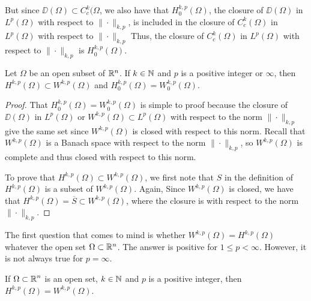 \begin{rmkList}
\begin{enumerate}
But since $\DD(\Omega) \subset C^k_c(\Omega$, we also have that
$\displaystyle H^{k,p}_0(\Omega)$, the closure of
$\displaystyle \DD(\Omega)$ in $\displaystyle L^p(\Omega)$ with
respect to $\|\cdot\|_{k,p}$, is included in the closure of
$\displaystyle C^k_c(\Omega)$ in
$\displaystyle L^p(\Omega)$ with respect to $\|\cdot\|_{k,p}$ 
Thus, the closure of $\displaystyle C^k_c(\Omega)$ in
$\displaystyle L^p(\Omega)$ with respect to $\|\cdot\|_{k,p}$
is $\displaystyle H^{k,p}_0(\Omega)$.
\end{enumerate}
\end{rmkList}

\begin{prop} \label{sob_WcontainsH}
Let $\Omega$ be an open subset of $\mathbb{R}^n$.  If
$k\in \mathbb{N}$ and $p$ is a positive integer or $\infty$, then
$\displaystyle H^{k,p}(\Omega) \subset W^{k,p}(\Omega)$ and
$\displaystyle H^{k,p}_0(\Omega) = W^{k,p}_0(\Omega)$.
\end{prop}

\begin{proof}
That $\displaystyle H^{k,p}_0(\Omega) = W^{k,p}_0(\Omega)$ is simple
to proof because the closure of $\DD(\Omega)$ in $\displaystyle L^p(\Omega)$ or
$\displaystyle W^{k,p}(\Omega)\subset L^p(\Omega)$ with respect to the
norm $\|\cdot\|_{k,p}$ give the same
set since $\displaystyle W^{k,p}(\Omega)$ is closed with respect to this norm.
Recall that $\displaystyle W^{k,p}(\Omega)$ is a Banach space with
respect to the norm 
$\|\cdot\|_{k,p}$, so $\displaystyle W^{k,p}(\Omega)$ is complete and
thus closed with respect to this norm.

To prove that $\displaystyle H^{k,p}(\Omega) \subset W^{k,p}(\Omega)$,
we first note that $S$ in the definition of
$\displaystyle H^{k,p}(\Omega)$ is a subset of
$\displaystyle W^{k,p}(\Omega)$.  Again, Since
$\displaystyle W^{k,p}(\Omega)$ is closed, we have that
$\displaystyle H^{k,p}(\Omega) = \overline{S} \subset W^{k,p}(\Omega)$,
where the closure is with respect to the norm $\|\cdot\|_{k,p}$.
\end{proof}

The first question that comes to mind is whether
$\displaystyle W^{k,p}(\Omega) = H^{k,p}(\Omega)$ whatever the open set
$\Omega \subset \mathbb{R}^n$.  The answer is positive for
$1\leq p < \infty$.  However, it is not always true for $p=\infty$.

\begin{theorem} \label{sob_HequalsW}
If $\displaystyle \Omega \subset \mathbb{R}^n$ is an open set, $k\in \mathbb{N}$ and $p$ is a
positive integer, then $\displaystyle H^{k,p}(\Omega) = W^{k,p}(\Omega)$.
\end{theorem}

